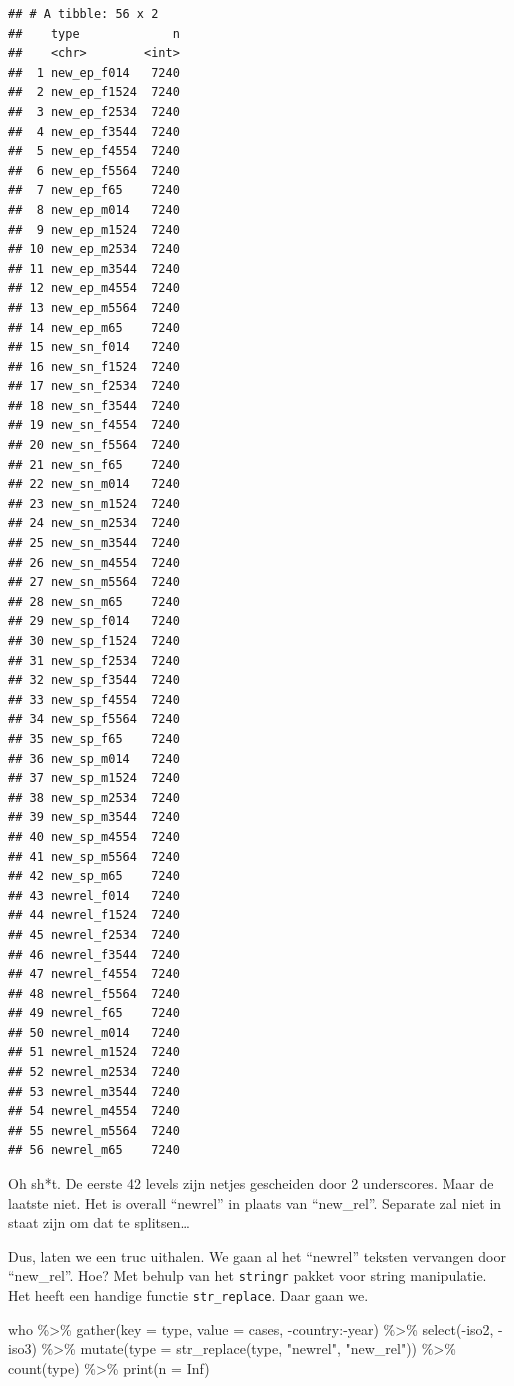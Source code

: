 \documentclass[]{tufte-book}
\newenvironment{Shaded}{}{}
\newcommand{\AttributeTok}[1]{\textcolor[rgb]{0.49,0.56,0.16}{#1}}
\newcommand{\ConstantTok}[1]{\textcolor[rgb]{0.53,0.00,0.00}{#1}}
\newcommand{\FunctionTok}[1]{\textcolor[rgb]{0.02,0.16,0.49}{#1}}
\newcommand{\NormalTok}[1]{#1}
\newcommand{\SpecialCharTok}[1]{\textcolor[rgb]{0.25,0.44,0.63}{#1}}
\newcommand{\StringTok}[1]{\textcolor[rgb]{0.25,0.44,0.63}{#1}}
\begin{document}
\begin{verbatim}
## # A tibble: 56 x 2
##    type             n
##    <chr>        <int>
##  1 new_ep_f014   7240
##  2 new_ep_f1524  7240
##  3 new_ep_f2534  7240
##  4 new_ep_f3544  7240
##  5 new_ep_f4554  7240
##  6 new_ep_f5564  7240
##  7 new_ep_f65    7240
##  8 new_ep_m014   7240
##  9 new_ep_m1524  7240
## 10 new_ep_m2534  7240
## 11 new_ep_m3544  7240
## 12 new_ep_m4554  7240
## 13 new_ep_m5564  7240
## 14 new_ep_m65    7240
## 15 new_sn_f014   7240
## 16 new_sn_f1524  7240
## 17 new_sn_f2534  7240
## 18 new_sn_f3544  7240
## 19 new_sn_f4554  7240
## 20 new_sn_f5564  7240
## 21 new_sn_f65    7240
## 22 new_sn_m014   7240
## 23 new_sn_m1524  7240
## 24 new_sn_m2534  7240
## 25 new_sn_m3544  7240
## 26 new_sn_m4554  7240
## 27 new_sn_m5564  7240
## 28 new_sn_m65    7240
## 29 new_sp_f014   7240
## 30 new_sp_f1524  7240
## 31 new_sp_f2534  7240
## 32 new_sp_f3544  7240
## 33 new_sp_f4554  7240
## 34 new_sp_f5564  7240
## 35 new_sp_f65    7240
## 36 new_sp_m014   7240
## 37 new_sp_m1524  7240
## 38 new_sp_m2534  7240
## 39 new_sp_m3544  7240
## 40 new_sp_m4554  7240
## 41 new_sp_m5564  7240
## 42 new_sp_m65    7240
## 43 newrel_f014   7240
## 44 newrel_f1524  7240
## 45 newrel_f2534  7240
## 46 newrel_f3544  7240
## 47 newrel_f4554  7240
## 48 newrel_f5564  7240
## 49 newrel_f65    7240
## 50 newrel_m014   7240
## 51 newrel_m1524  7240
## 52 newrel_m2534  7240
## 53 newrel_m3544  7240
## 54 newrel_m4554  7240
## 55 newrel_m5564  7240
## 56 newrel_m65    7240
\end{verbatim}

Oh sh*t. De eerste 42 levels zijn netjes gescheiden door 2 underscores. Maar de laatste niet. Het is overall ``newrel'' in plaats van ``new\_rel''. Separate zal niet in staat zijn om dat te splitsen\ldots{}

Dus, laten we een truc uithalen. We gaan al het ``newrel'' teksten vervangen door ``new\_rel''. Hoe? Met behulp van het \texttt{stringr} pakket voor string manipulatie. Het heeft een handige functie \texttt{str\_replace}. Daar gaan we.

\begin{Shaded}
\begin{Highlighting}[]
\NormalTok{who }\SpecialCharTok{\%\textgreater{}\%}
  \FunctionTok{gather}\NormalTok{(}\AttributeTok{key =}\NormalTok{ type, }\AttributeTok{value =}\NormalTok{ cases, }\SpecialCharTok{{-}}\NormalTok{country}\SpecialCharTok{:{-}}\NormalTok{year) }\SpecialCharTok{\%\textgreater{}\%}
  \FunctionTok{select}\NormalTok{(}\SpecialCharTok{{-}}\NormalTok{iso2, }\SpecialCharTok{{-}}\NormalTok{iso3) }\SpecialCharTok{\%\textgreater{}\%}
  \FunctionTok{mutate}\NormalTok{(}\AttributeTok{type =} \FunctionTok{str\_replace}\NormalTok{(type, }\StringTok{"newrel"}\NormalTok{, }\StringTok{"new\_rel"}\NormalTok{)) }\SpecialCharTok{\%\textgreater{}\%}
  \FunctionTok{count}\NormalTok{(type) }\SpecialCharTok{\%\textgreater{}\%}
  \FunctionTok{print}\NormalTok{(}\AttributeTok{n =} \ConstantTok{Inf}\NormalTok{)}
\end{Highlighting}
\end{Shaded}
\end{document}

